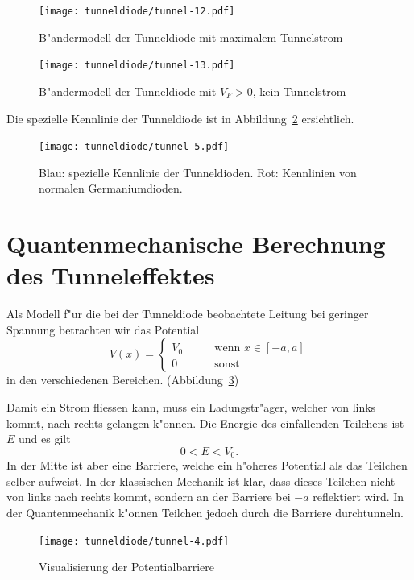 \begin{refsection}
\begin{figure}
\centering
\texttt{[image: tunneldiode/tunnel-12.pdf]}
\caption{B"andermodell der Tunneldiode mit maximalem Tunnelstrom
\label{tunnel:Baendermodellmax}}

\centering
\texttt{[image: tunneldiode/tunnel-13.pdf]}
\caption{B"andermodell der Tunneldiode mit $V_F > 0$, kein Tunnelstrom
\label{tunnel:Baendermodellmin}}
\end{figure}

Die spezielle Kennlinie der Tunneldiode ist in Abbildung~\ref{tunnel:Tunneldiode} ersichtlich.

\begin{figure}	%
\centering
\texttt{[image: tunneldiode/tunnel-5.pdf]}
\caption{Blau: spezielle Kennlinie der Tunneldioden. Rot: Kennlinien von normalen Germaniumdioden.
\label{tunnel:Tunneldiode}}
\end{figure}

\section{Quantenmechanische Berechnung des Tunneleffektes}
\label{tunnel:tunneleffekt}
Als Modell f"ur die bei der Tunneldiode beobachtete Leitung bei geringer Spannung betrachten wir das Potential
\[
V(x)=\begin{cases}
V_0& \qquad \text{wenn } x \in [-a,a]\\
0&   \qquad \text{sonst}
\end{cases}
\]
in den verschiedenen Bereichen. (Abbildung~\ref{tunnel:Potentialbarriere})

Damit ein Strom fliessen kann, muss ein Ladungstr"ager, welcher von links kommt, nach rechts gelangen k"onnen. 
Die Energie des einfallenden Teilchens ist $E$ und es gilt
\[
0 < E < V_0.
\]
In der Mitte ist aber eine Barriere, welche ein h"oheres Potential als das Teilchen selber aufweist. 
In der klassischen Mechanik ist klar, dass dieses Teilchen nicht von links nach rechts kommt, sondern an der Barriere bei $-a$ reflektiert wird. 
In der Quantenmechanik k"onnen Teilchen jedoch durch die Barriere durchtunneln.

\begin{figure}	%
\centering
\texttt{[image: tunneldiode/tunnel-4.pdf]}
\caption{Visualisierung der Potentialbarriere
\label{tunnel:Potentialbarriere}}
\end{figure}


\end{refsection}
